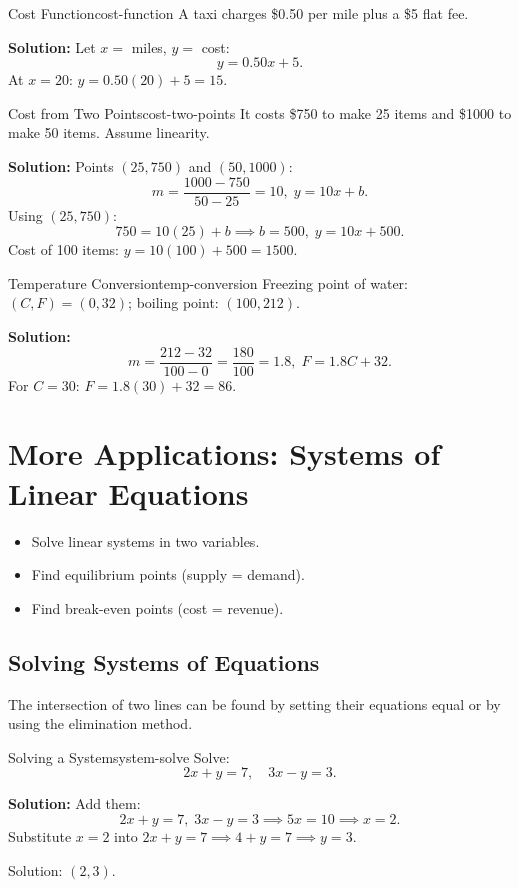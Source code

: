 \begin{example}{Cost Function}{cost-function}
A taxi charges \$0.50 per mile plus a \$5 flat fee.

\textbf{Solution:} Let $x=$ miles, $y=$ cost:
\[
y=0.50x+5.
\]
At $x=20$: $y=0.50(20)+5=15.$
\end{example}

\begin{example}{Cost from Two Points}{cost-two-points}
It costs \$750 to make 25 items and \$1000 to make 50 items. Assume linearity.

\textbf{Solution:} Points $(25,750)$ and $(50,1000)$:
\[
m=\frac{1000-750}{50-25}=10,\;y=10x+b.
\]
Using $(25,750)$:
\[
750=10(25)+b \implies b=500,\;y=10x+500.
\]
Cost of 100 items: $y=10(100)+500=1500.$
\end{example}

\begin{example}{Temperature Conversion}{temp-conversion}
Freezing point of water: $(C,F)=(0,32)$; boiling point: $(100,212)$.

\textbf{Solution:}
\[
m=\frac{212-32}{100-0}=\frac{180}{100}=1.8,\;F=1.8C+32.
\]
For $C=30$: $F=1.8(30)+32=86.$
\end{example}

\section{More Applications: Systems of Linear Equations}
\begin{outcome}
\begin{itemize}
\item Solve linear systems in two variables.
\item Find equilibrium points (supply = demand).
\item Find break-even points (cost = revenue).
\end{itemize}
\end{outcome}

\subsection*{Solving Systems of Equations}
The intersection of two lines can be found by setting their equations equal or by using the elimination method.

\begin{example}{Solving a System}{system-solve}
Solve:
\[
2x+y=7,\quad 3x-y=3.
\]

\textbf{Solution:} Add them:
\[
2x+y=7,\;3x-y=3 \implies 5x=10 \implies x=2.
\]
Substitute $x=2$ into $2x+y=7 \implies 4+y=7 \implies y=3.$

Solution: $(2,3)$.
\end{example}

